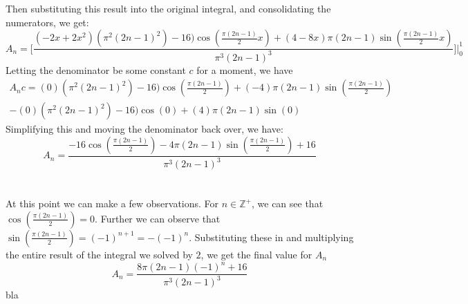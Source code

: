 \documentclass{article}
\begin{document}
Then substituting this result into the original integral, and consolidating the numerators, we get:
\begin{equation}
A_n  = \Big[ \frac{(-2x + 2x^2)(\pi^2(2n-1)^2) - 16)\cos(\frac{\pi(2n-1)}{2}x) + (4-8x)\pi(2n-1)\sin(\frac{\pi(2n-1)}{2}x)}{\pi^3(2n-1)^3} \Big] \Big|_0^1
\end{equation}
Letting the denominator be some constant $c$ for a moment, we have
\begin{multline}
A_n c = (0)(\pi^2(2n-1)^2) - 16)\cos(\frac{\pi(2n-1)}{2}) + (-4)\pi(2n-1)\sin(\frac{\pi(2n-1)}{2}) \\ - (0)(\pi^2(2n-1)^2) - 16)\cos(0) + (4)\pi(2n-1)\sin(0)
\end{multline}
Simplifying this and moving the  denominator back over, we have:
\begin{equation}
A_n = \frac{-16\cos(\frac{\pi(2n-1)}{2}) - 4\pi(2n-1)\sin(\frac{\pi(2n-1)}{2}) + 16}{\pi^3(2n-1)^3}
\end{equation}~\\
\\
At this point we can make a few observations. For $n \in \mathbb{Z}^+$, we can see that $\cos(\frac{\pi(2n-1)}{2}) = 0$. Further we can observe that $\sin(\frac{\pi(2n-1)}{2}) = (-1)^{n+1} = -(-1)^n$. Substituting these in and multiplying the entire result of the integral we solved by $2$, we get the final value for $A_n$ 
\begin{equation}
A_n = \frac{8\pi(2n-1)(-1)^n + 16}{\pi^3(2n-1)^3}
\end{equation}
bla
\end{document}

